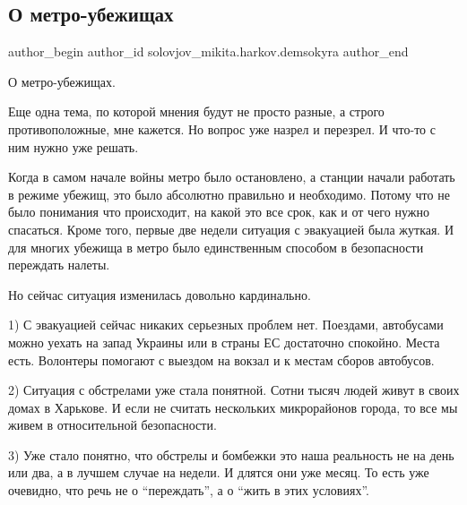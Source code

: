  
 
 
 
 
 
\subsection{О метро-убежищах}
\label{sec:29_03_2022.fb.solovjov_mikita.harkov.demsokyra.2.o_metro_ubezhischah}
 
\ifcmt
 author_begin
   author_id solovjov_mikita.harkov.demsokyra
 author_end
\fi

О метро-убежищах. 

Еще одна тема, по которой мнения будут не просто разные, а строго
противоположные, мне кажется. Но вопрос уже назрел и перезрел. И что-то с ним
нужно уже решать. 

Когда в самом начале войны метро было остановлено, а станции начали работать в
режиме убежищ, это было абсолютно правильно и необходимо. Потому что не было
понимания что происходит, на какой это все срок, как и от чего нужно спасаться.
Кроме того, первые две недели ситуация с эвакуацией была жуткая. И для многих
убежища в метро было единственным способом в безопасности переждать налеты. 

Но сейчас ситуация изменилась довольно кардинально. 

1) С эвакуацией сейчас никаких серьезных проблем нет. Поездами, автобусами
можно уехать на запад Украины или в страны ЕС достаточно спокойно. Места есть.
Волонтеры помогают с выездом на вокзал и к местам сборов автобусов. 

2) Ситуация с обстрелами уже стала понятной. Сотни тысяч людей живут в своих
домах в Харькове. И если не считать нескольких микрорайонов города, то все мы
живем в относительной безопасности. 

3) Уже стало понятно, что обстрелы и бомбежки это наша реальность не на день
или два, а в лучшем случае на недели. И длятся они уже месяц. То есть уже
очевидно, что речь не о \enquote{переждать}, а о \enquote{жить в этих
условиях}. 

